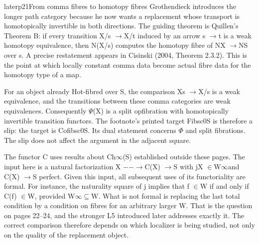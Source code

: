 \begin{dcomment}{later}{p21}{From comma fibres to homotopy fibres}
Grothendieck introduces the longer path category because he now wants a replacement whose transport is homotopically invertible in both directions. The guiding theorem is Quillen’s Theorem B: if every transition X/s \ensuremath{\to}X/t induced by an arrow s \ensuremath{\to}t is a weak homotopy equivalence, then N(X/s) computes the homotopy fibre of NX \ensuremath{\to}NS over s. A precise restatement appears in Cisinski (2004, Theorem 2.3.2). This is the point at which locally constant comma data become actual fibre data for the homotopy type of a map.

For an object already Hot-fibred over S, the comparison Xs \ensuremath{\to}X/s is a weak equivalence, and the transitions between these comma categories are weak equivalences. Consequently \ensuremath{\Psi}(X) is a split opfibration with homotopically invertible transition functors. The footnote’s printed target Fibsc0S is therefore a slip: the target is Cofibsc0S. Its dual statement concerns \ensuremath{\Phi} and split fibrations. The slip does not affect the argument in the adjacent square.

The functor C uses results about Ch\ensuremath{\infty}(S) established outside these pages. The input here is a natural factorization X \ensuremath{-}\ensuremath{-}\ensuremath{\to}C(X) \ensuremath{\to}S with jX \ensuremath{\in}W\ensuremath{\infty}and C(X) \ensuremath{\to}S perfect. Given this input, all subsequent uses of its functoriality are formal. For instance, the naturality square of j implies that f \ensuremath{\in}W if and only if C(f) \ensuremath{\in}W, provided W\ensuremath{\infty}\ensuremath{\subseteq}W. What is not formal is replacing the last total condition by a condition on fibres for an arbitrary larger W. That is the question on pages 22--24, and the stronger L5 introduced later addresses exactly it. The correct comparison therefore depends on which localizer is being studied, not only on the quality of the replacement object.

\end{dcomment}


